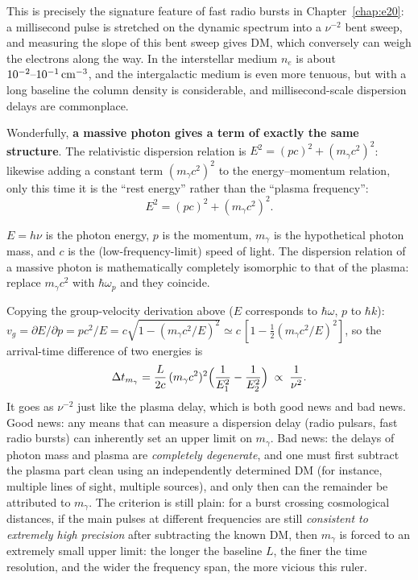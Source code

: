 This is precisely the signature feature of fast radio bursts in Chapter~\ref{chap:e20}: a millisecond pulse is stretched on the dynamic spectrum into a \(\nu^{-2}\) bent sweep, and measuring the slope of this bent sweep gives DM, which conversely can weigh the electrons along the way. In the interstellar medium \(n_e\) is about \(10^{-2}\text{--}10^{-1}\,{\rm cm^{-3}}\), and the intergalactic medium is even more tenuous, but with a long baseline the column density is considerable, and millisecond-scale dispersion delays are commonplace.

Wonderfully, \textbf{a massive photon gives a term of exactly the same structure}. The relativistic dispersion relation is \(E^2=(pc)^2+(m_\gamma c^2)^2\): likewise adding a constant term \((m_\gamma c^2)^2\) to the energy--momentum relation, only this time it is the ``rest energy'' rather than the ``plasma frequency'':
\begin{equation}
  E^2=(pc)^2+(m_\gamma c^2)^2 .
  \label{eq:e23-massive-photon}
\end{equation}
\begin{formulaexplain}
\(E=h\nu\) is the photon energy, \(p\) is the momentum, \(m_\gamma\) is the hypothetical photon mass, and \(c\) is the (low-frequency-limit) speed of light. The dispersion relation of a massive photon is mathematically completely isomorphic to that of the plasma: replace \(m_\gamma c^2\) with \(\hbar\omega_p\) and they coincide.
\end{formulaexplain}
Copying the group-velocity derivation above (\(E\) corresponds to \(\hbar\omega\), \(p\) to \(\hbar k\)): \(v_g=\partial E/\partial p=pc^2/E=c\sqrt{1-(m_\gamma c^2/E)^2}\simeq c\,[1-\tfrac12(m_\gamma c^2/E)^2]\), so the arrival-time difference of two energies is
\[
  \Delta t_{m_\gamma}=\frac{L}{2c}\,(m_\gamma c^2)^2\Bigl(\frac{1}{E_1^2}-\frac{1}{E_2^2}\Bigr)
  \;\propto\;\frac{1}{\nu^2}.
\]
It goes as \(\nu^{-2}\) just like the plasma delay, which is both good news and bad news. Good news: any means that can measure a dispersion delay (radio pulsars, fast radio bursts) can inherently set an upper limit on \(m_\gamma\). Bad news: the delays of photon mass and plasma are \emph{completely degenerate}, and one must first subtract the plasma part clean using an independently determined DM (for instance, multiple lines of sight, multiple sources), and only then can the remainder be attributed to \(m_\gamma\). The criterion is still plain: for a burst crossing cosmological distances, if the main pulses at different frequencies are still \emph{consistent to extremely high precision} after subtracting the known DM, then \(m_\gamma\) is forced to an extremely small upper limit: the longer the baseline \(L\), the finer the time resolution, and the wider the frequency span, the more vicious this ruler.

